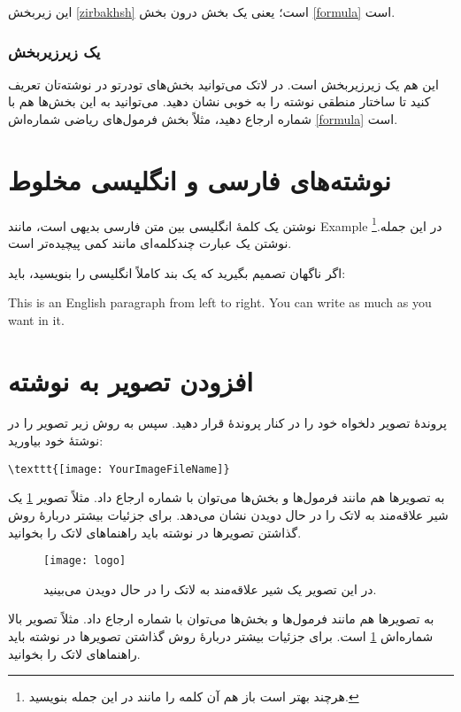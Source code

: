 این زیربخش \ref{zirbakhsh} است؛ یعنی یک بخش درون بخش \ref{formula} است.
\subsubsection{یک زیرزیربخش}
این هم یک زیرزیربخش است. در لاتک می‌توانید بخش‌های تودرتو در نوشته‌تان تعریف کنید تا ساختار منطقی نوشته را به خوبی نشان دهید. می‌توانید به این بخش‌ها هم با شماره ارجاع دهید، مثلاً بخش فرمول‌های ریاضی شماره‌اش \ref{formula} است.
\section{نوشته‌های فارسی و انگلیسی مخلوط}
نوشتن یک کلمهٔ انگلیسی بین متن فارسی بدیهی است، مانند Example در این جمله.\footnote{هرچند بهتر است باز هم آن کلمه را مانند  در این جمله بنویسید.}
نوشتن یک عبارت چندکلمه‌ای مانند
  کمی پیچیده‌تر است.

اگر ناگهان تصمیم بگیرید که یک بند کاملاً انگلیسی را بنویسید، باید:
\begin{latin}
This is an English paragraph from left to right. You can write as much as you want in it.
\end{latin}
\section{افزودن تصویر به نوشته}
پروندهٔ تصویر دلخواه خود را در کنار پروندهٔ  قرار دهید. سپس به روش زیر تصویر را در نوشتهٔ خود بیاورید:
\begin{latin}
\begin{verbatim}
\texttt{[image: YourImageFileName]}
\end{verbatim}
\end{latin}
به تصویرها هم مانند فرمول‌ها و بخش‌ها می‌توان با شماره ارجاع داد. مثلاً تصویر \ref{fig:shir} یک شیر علاقه‌مند به لاتک را در حال دویدن نشان می‌دهد. برای جزئیات بیشتر دربارهٔ روش گذاشتن تصویرها در نوشته باید راهنماهای لاتک را بخوانید.
\begin{figure}[ht]
\centerline{\texttt{[image: logo]}}
\caption{در این تصویر یک شیر علاقه‌مند به لاتک را در حال دویدن می‌بینید.}
\label{fig:shir}
\end{figure}

به تصویرها هم مانند فرمول‌ها و بخش‌ها می‌توان با شماره ارجاع داد. مثلاً تصویر بالا شماره‌اش \ref{fig:shir} است. برای جزئیات بیشتر دربارهٔ روش گذاشتن تصویرها در نوشته باید راهنماهای لاتک را بخوانید.

